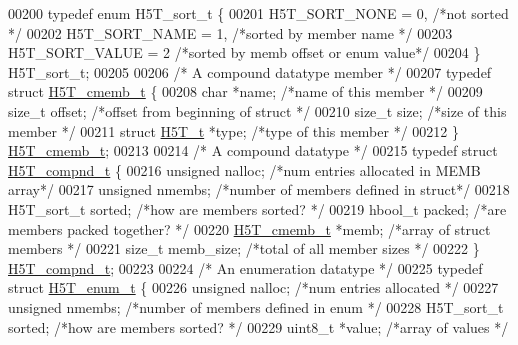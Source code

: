 \begin{DoxyCode}
00200 \textcolor{keyword}{typedef} \textcolor{keyword}{enum} H5T\_sort\_t \{
00201     H5T\_SORT\_NONE   = 0,        \textcolor{comment}{/*not sorted                 */}
00202     H5T\_SORT\_NAME   = 1,        \textcolor{comment}{/*sorted by member name          */}
00203     H5T\_SORT\_VALUE  = 2         \textcolor{comment}{/*sorted by memb offset or enum value*/}
00204 \} H5T\_sort\_t;
00205 
00206 \textcolor{comment}{/* A compound datatype member */}
00207 \textcolor{keyword}{typedef} \textcolor{keyword}{struct }\hyperlink{struct_h5_t__cmemb__t}{H5T\_cmemb\_t} \{
00208     \textcolor{keywordtype}{char}        *name;      \textcolor{comment}{/*name of this member            */}
00209     \textcolor{keywordtype}{size\_t}      offset;     \textcolor{comment}{/*offset from beginning of struct    */}
00210     \textcolor{keywordtype}{size\_t}      size;       \textcolor{comment}{/*size of this member            */}
00211     \textcolor{keyword}{struct }\hyperlink{struct_h5_t__t}{H5T\_t}   *type;      \textcolor{comment}{/*type of this member            */}
00212 \} \hyperlink{struct_h5_t__cmemb__t}{H5T\_cmemb\_t};
00213 
00214 \textcolor{comment}{/* A compound datatype */}
00215 \textcolor{keyword}{typedef} \textcolor{keyword}{struct }\hyperlink{struct_h5_t__compnd__t}{H5T\_compnd\_t} \{
00216     \textcolor{keywordtype}{unsigned}    nalloc;     \textcolor{comment}{/*num entries allocated in MEMB array*/}
00217     \textcolor{keywordtype}{unsigned}    nmembs;     \textcolor{comment}{/*number of members defined in struct*/}
00218     H5T\_sort\_t  sorted;     \textcolor{comment}{/*how are members sorted?        */}
00219     hbool\_t     packed;     \textcolor{comment}{/*are members packed together?       */}
00220     \hyperlink{struct_h5_t__cmemb__t}{H5T\_cmemb\_t}  *memb;      \textcolor{comment}{/*array of struct members        */}
00221     \textcolor{keywordtype}{size\_t}      memb\_size;  \textcolor{comment}{/*total of all member sizes          */}
00222 \} \hyperlink{struct_h5_t__compnd__t}{H5T\_compnd\_t};
00223 
00224 \textcolor{comment}{/* An enumeration datatype */}
00225 \textcolor{keyword}{typedef} \textcolor{keyword}{struct }\hyperlink{struct_h5_t__enum__t}{H5T\_enum\_t} \{
00226     \textcolor{keywordtype}{unsigned}    nalloc;     \textcolor{comment}{/*num entries allocated          */}
00227     \textcolor{keywordtype}{unsigned}    nmembs;     \textcolor{comment}{/*number of members defined in enum  */}
00228     H5T\_sort\_t  sorted;     \textcolor{comment}{/*how are members sorted?        */}
00229     uint8\_t *value;     \textcolor{comment}{/*array of values            */}

\end{DoxyCode}
